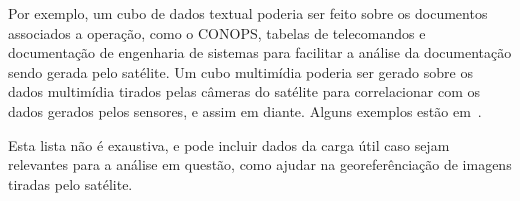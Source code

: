 Por exemplo, um cubo de dados textual poderia ser feito sobre os documentos associados a operação, como o CONOPS, tabelas de telecomandos e documentação de engenharia de sistemas para facilitar a análise da documentação sendo gerada pelo satélite. Um cubo multimídia poderia ser gerado sobre os dados multimídia tirados pelas câmeras do satélite para correlacionar com os dados gerados pelos sensores, e assim em diante. Alguns exemplos estão em~\cite{silva:2015:abordagensParaCubo}.

Esta lista não é exaustiva, e pode incluir dados da carga útil caso sejam relevantes para a análise em questão, como ajudar na georeferênciação de imagens tiradas pelo satélite.

